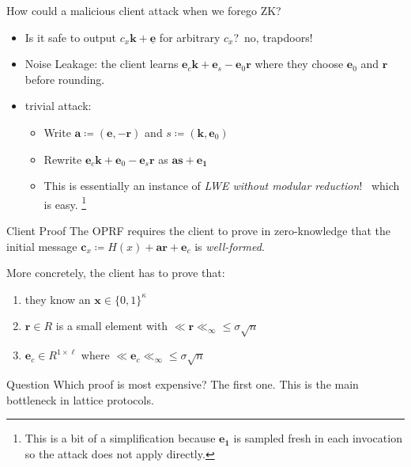 \documentclass[aspectratio=169, 12pt,handout]{beamer}
\newcommand{\bv}[1]{\mathbf{#1}}
\begin{document}
\begin{frame}{How could a malicious client attack when we forego ZK? }
  \begin{itemize}
    \item Is it safe to output $c_x\bv{k}+\underline{\bv{e}}$ for arbitrary
      $c_x$?\pause ~no, trapdoors!\pause
    \item Noise Leakage: the client learns $\bv{e}_c\bv{k}+\bv{e}_s-\bv{e}_0\bv{ r}$
      where they choose $\bv{e}_0$ and $\bv{r}$ before rounding.\pause
    \item trivial attack:
      \begin{itemize}
        \item Write $\bv{a} \coloneqq (\bv{e}, \bv{-r})$ and $s \coloneqq (\bv{k}, \bv{e}_0)$
        \item Rewrite
          $\bv{e}_c \bv{k} + \bv{e}_0 - \bv{e}_s \bv{r}$
          as $\bv{as} + \bv{e_1}$\pause
        \item This is essentially an instance of \emph{LWE without modular
          reduction}!~\cite{AC:BDEFT18} which is easy. \footnote{
            This is a bit of a simplification because $\bv{e_1}$ is sampled fresh in each
          invocation so the attack does not apply directly.}
      \end{itemize}
  \end{itemize}
\end{frame}


\begin{frame}{Client Proof}
  The OPRF requires the client to prove in zero-knowledge that the
  initial message
  $\bv{c}_x \coloneqq H(x) + \bv{ar} + \bv{e}_c$ is \emph{well-formed}.\pause

  More concretely, the client has to prove that:
  \begin{enumerate}
    \item they know an $\bv{x}\in \{0,1\}^\kappa$ \pause
    \item $\bv{r}\in R$ is a small element with $\ll \bv{r} \ll_\infty \leq \sigma \sqrt{n}$\pause
    \item $\bv{e}_c\in R^{1\times \ell}$  where $\ll\bv{e}_c\ll_\infty \leq \sigma
      \sqrt{n}$\pause
  \end{enumerate}
  \alert{Question} Which proof is most expensive? \pause
  The first one. This is the main bottleneck in lattice protocols. 

\end{frame}
\end{document}
